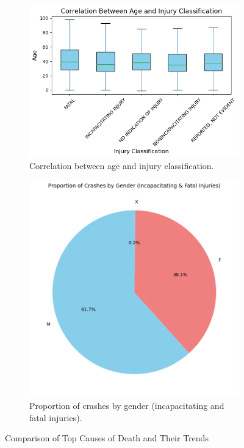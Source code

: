 \documentclass[a4paper,10pt]{article}
\begin{document}
\begin{figure}[ht!]
	\centering
	\begin{subfigure}[t]{0.48\textwidth}
		\centering
		\includegraphics[width=\textwidth]{images/age-injury-classification.png} %
    \caption{Correlation between age and injury classification.}
    \label{fig:3.2}
	\end{subfigure}
	\hfill
	\begin{subfigure}[t]{0.48\textwidth}
		\centering
		\includegraphics[width=\textwidth]{images/crashes-by-gender.png} %
    \caption{Proportion of crashes by gender (incapacitating and fatal injuries).}
    \label{fig:3.3}
    \end{subfigure}
	\caption{Comparison of Top Causes of Death and Their Trends}
\end{figure}
\end{document}
